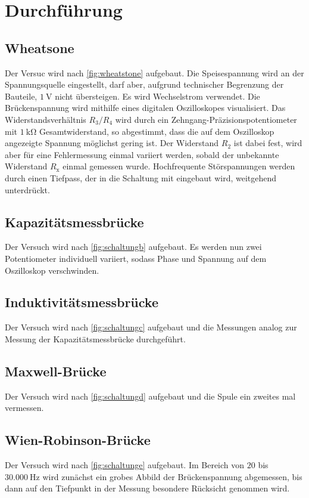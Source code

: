 \section{Durchführung}
\label{sec:Durchführung}

\subsection{Wheatsone}
Der Versuc wird nach \autoref{fig:wheatstone} aufgebaut. Die Speisespannung wird an der Spannungsquelle eingestellt, 
darf aber, aufgrund technischer Begrenzung der Bauteile, $\SI{1}{\volt}$ nicht übersteigen. Es wird Wechselstrom 
verwendet. Die Brückenspannung wird mithilfe eines digitalen Oszilloskopes visualisiert. Das 
Widerstandsverhältnis $R_3/R_4$ wird durch ein Zehngang-Präzisionspotentiometer mit $\SI{1}{\kilo\ohm}$ Gesamtwiderstand,
so abgestimmt, dass die auf dem Oszilloskop angezeigte Spannung möglichst gering ist. Der Widerstand $R_2$ ist dabei fest, 
wird aber für eine Fehlermessung einmal variiert werden, sobald der unbekannte Widerstand $R_{\text{x}}$ einmal gemessen wurde.
Hochfrequente Störspannungen werden durch einen Tiefpass, der in die Schaltung mit eingebaut wird, weitgehend unterdrückt.

\subsection{Kapazitätsmessbrücke}
Der Versuch wird nach \autoref{fig:schaltungb} aufgebaut. Es werden nun zwei Potentiometer individuell variiert, sodass
Phase und Spannung auf dem Oszilloskop verschwinden. 

\subsection{Induktivitätsmessbrücke}
Der Versuch wird nach \autoref{fig:schaltungc} aufgebaut und die Messungen analog zur Messung der Kapazitätsmessbrücke durchgeführt.

\subsection{Maxwell-Brücke}
Der Versuch wird nach \autoref{fig:schaltungd} aufgebaut und die Spule ein zweites mal vermessen.

\subsection{Wien-Robinson-Brücke}
Der Versuch wird nach \autoref{fig:schaltunge} aufgebaut.
Im Bereich von $20$ bis $\SI{30.000}{\hertz}$ wird zunächst ein grobes Abbild der Brückenspannung abgemessen, bis
dann auf den Tiefpunkt in der Messung besondere Rücksicht genommen wird. 
